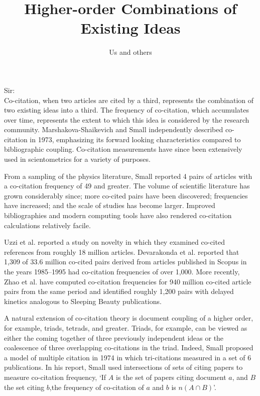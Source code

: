 \documentclass[notitlepage]{report}
\title{Higher-order Combinations of Existing Ideas}
\author{Us and others}
\date{}
\begin{document}
\maketitle
\thispagestyle{empty}
Sir:\\

Co-citation, when two articles are cited by a third, represents the combination of two existing ideas into a third. The frequency of co-citation, which accumulates over time, represents the extent to which this idea is considered by the research community. Marshakova-Shaikevich and Small independently described co-citation in 1973, emphasizing its forward looking characteristics compared to bibliographic coupling.  Co-citation measurements have since been extensively used in scientometrics for a variety of purposes.

From a sampling of the physics literature, Small reported 4 pairs of articles with a co-citation frequency of 49 and greater. The volume of scientific literature has grown considerably since; more co-cited pairs have been discovered; frequencies have increased; and the scale of studies has become larger. Improved bibliographies and modern computing tools have also rendered co-citation calculations relatively facile. 

Uzzi et al. reported a study on novelty in which they examined co-cited references from roughly 18 million articles. Devarakonda et al. reported that 1,309 of 33.6 million co-cited pairs derived from articles published in Scopus in the years 1985--1995 had co-citation frequencies of over 1,000. More recently, Zhao et al. have computed co-citation frequencies for 940 million co-cited article pairs from the same period and identified roughly 1,200 pairs with delayed kinetics analogous to Sleeping Beauty publications. 

A natural extension of co-citation theory is document coupling of a higher order, for example, triads, tetrads, and greater. Triads, for example, can be viewed as either the coming together of three previously independent ideas or the coalescence of three overlapping co-citations in the triad. Indeed, Small proposed a model of multiple citation in 1974 in which tri-citations measured in a set of 6 publications. In his report, Small used intersections of sets of citing papers to measure co-citation frequency, `If $A$ is the set of papers citing document $a$, and $B$ the set citing $b$,the frequency of co-citation of $a$ and $b$ is $n(A \cap B)$'.
\end{document}
